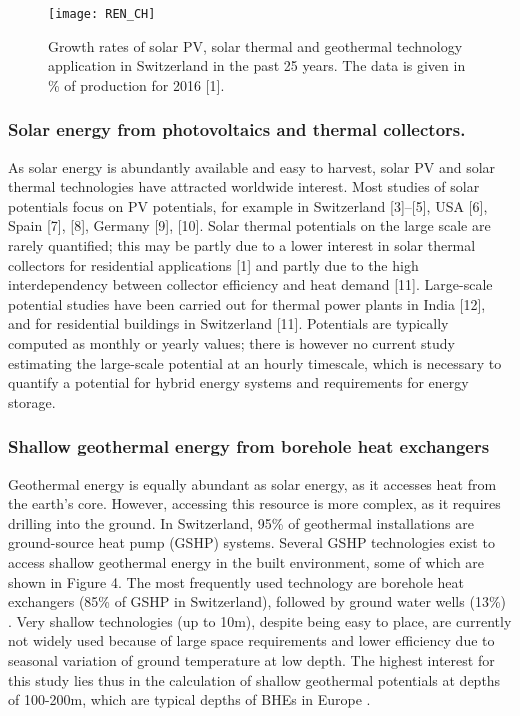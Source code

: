 \begin{figure}[tb] 
\centering 
\texttt{[image: REN\_CH]} 
\caption[Growth rates of solar PV, solar thermal and geothermal technology application in Switzerland in the past 25 years.]{Growth rates of solar PV, solar thermal and geothermal technology application in Switzerland in the past 25 years. The data is given in \% of production for 2016 [1].}
\label{fig:ren_ch} 
\end{figure}

\subsubsection{Solar energy from photovoltaics and thermal collectors.}
As solar energy is abundantly available and easy to harvest, solar PV and solar thermal technologies have attracted worldwide interest. Most studies of solar potentials focus on PV potentials, for example in Switzerland [3]–[5], USA [6], Spain [7], [8], Germany [9], [10]. Solar thermal potentials on the large scale are rarely quantified; this may be partly due to a lower interest in solar thermal collectors for residential applications [1] and partly due to the high interdependency between collector efficiency and heat demand [11]. Large-scale potential studies have been carried out for thermal power plants in India [12], and for residential buildings in Switzerland [11]. Potentials are typically computed as monthly or yearly values; there is however no current study estimating the large-scale potential at an hourly timescale, which is necessary to quantify a potential for hybrid energy systems and requirements for energy storage. 

\subsubsection{Shallow geothermal energy from borehole heat exchangers}
Geothermal energy is equally abundant as solar energy, as it accesses heat from the earth’s core. However, accessing this resource is more complex, as it requires drilling into the ground. In Switzerland, 95\% of geothermal installations are ground-source heat pump (GSHP) systems. Several GSHP technologies exist to access shallow geothermal energy in the built environment, some of which are shown in Figure 4. The most frequently used technology are borehole heat exchangers (85\% of GSHP in Switzerland), followed by ground water wells (13\%) \cite{blum_statistik_2016}. Very shallow technologies (up to 10m), despite being easy to place, are currently not widely used because of large space requirements and lower efficiency due to seasonal variation of ground temperature at low depth. The highest interest for this study lies thus in the calculation of shallow geothermal potentials at depths of 100-200m, which are typical depths of BHEs in Europe \cite{rybach_design_2014}.

